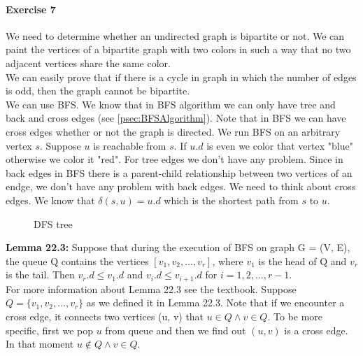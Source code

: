 \documentclass{book}
\begin{document}
	\paragraph{Exercise 7}
	We need to determine whether an undirected graph is bipartite or not. We can paint the vertices of a bipartite graph with two colors in such a way that no two adjacent vertices share the same color.\\
	We can easily prove that if there is a cycle in graph in which the number of edges is odd, then the graph cannot be bipartite. \\
	We can use BFS. We know that in BFS algorithm we can only have tree and back and cross edges (see \ref{psec:BFSAlgorithm}). Note that in BFS we can have cross edges whether or not the graph is directed. We run BFS on an arbitrary vertex $s$. Suppose $u$ is reachable from $s$. If $u.d$ is even we color that vertex "blue" otherwise we color it "red". For tree edges we don't have any problem. Since in back edges in BFS there is a parent-child relationship between two vertices of an endge, we don't have any problem with back edges. We need to think about cross edges. We know that $\delta(s, u) = u.d$ which is the shortest path from $s$ to $u$. \\
	
			\begin{figure}[h!]
				\centering
				\caption{DFS tree}
				\label{fig:DFS tree}
			\end{figure}
			
	\textbf{Lemma 22.3: } Suppose that during the execution of BFS on graph G = (V, E), the queue Q contains the vertices $[v_1, v_2, \dots , v_r]$, where $v_1$ is the head of Q and $v_r$ is the tail. Then $v_r.d \le v_1.d$ and $v_i.d \le v_{i+1}.d$ for $i = 1, 2, \dots, r - 1$.\\
	
	For more information about Lemma 22.3 see the textbook. Suppose $Q = \{v_1, v_2, \dots , v_r\}$ as we defined it in Lemma 22.3. Note that if we encounter a cross edge, it connects two vertices (u, v) that $u \in Q \land v \in Q$. To be more specific, first we pop $u$ from queue and then we find out $(u, v)$ is a cross edge. In that moment $u \notin Q \land v \in Q$.\\
	
\end{document}
